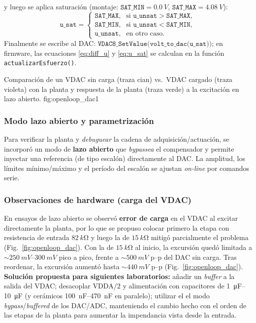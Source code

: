 y luego se aplica saturación (montaje: \(\texttt{SAT\_MIN}=\SI{0.0}{V}\), \(\texttt{SAT\_MAX}=\SI{4.08}{V}\)):
\begin{equation}
	\label{eq:u_sat}
	\texttt{u\_sat}=
	\begin{cases}
		\texttt{SAT\_MAX}, & \text{si } \texttt{u\_unsat}>\texttt{SAT\_MAX},\\
		\texttt{SAT\_MIN}, & \text{si } \texttt{u\_unsat}<\texttt{SAT\_MIN},\\
		\texttt{u\_unsat}, & \text{en otro caso.}
	\end{cases}
\end{equation}
Finalmente se escribe al DAC: \(\texttt{VDAC8\_SetValue(volt\_to\_dac(u\_sat));}\)
en firmware, las ecuaciones \eqref{eq:diff_u} y \eqref{eq:u_sat} se calculan en la función \texttt{actualizarEsfuerzo()}.


{Comparación de un  VDAC sin carga (traza cian) vs.\ VDAC cargado (traza violeta) con la planta y respuesta de la planta (traza verde) a la excitación en lazo abierto.}
{fig:openloop_dac}{1}

\subsubsection{Modo lazo abierto y parametrización}
Para verificar la planta y \emph{debuguear} la cadena de adquisición/actuación, se incorporó un modo de \textbf{lazo abierto} que \emph{bypassea} el compensador y permite inyectar una referencia (de tipo escalón) directamente al DAC. La amplitud, los límites mínimo/máximo y el período del escalón se ajustan \emph{on-line} por comandos serie.

\subsubsection{Observaciones de hardware (carga del VDAC)}
En ensayos de lazo abierto se observó \textbf{error de carga} en el VDAC al excitar directamente la planta, por lo que se propuso colocar primero la etapa con resistencia de entrada \(\SI{82}{k\ohm}\) y luego la de \(\SI{15}{k\ohm}\) mitigó parcialmente el problema (Fig.~\ref{fig:openloop_dac}). Con la de \(\SI{15}{k\ohm}\) al inicio, la excursión quedó limitada a \(\sim\SI{250}{mV}\)–\(\SI{300}{mV}\) pico a pico, frente a \(\sim\SI{500}{mV}\) p–p del DAC sin carga. Tras reordenar, la excursión aumentó hasta \(\sim\SI{440}{mV}\) p–p (Fig.~\ref{fig:openloop_dac}).
\textbf{Solución propuesta para siguientes laboratorios:} añadir un \emph{buffer} a la salida del VDAC; desacoplar \(\mathrm{VDDA}/2\) y alimentación con capacitores de \SIrange{1}{10}{\micro\farad} (y cerámicos \SIrange{100}{470}{nF} en paralelo); utilizar el el modo \emph{bypass}/\emph{buffered} de los DAC/ADC, manteniendo el cambio hecho con el orden de las etapas de la planta para aumentar la impendancia vista desde la entrada.



